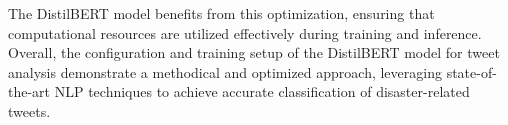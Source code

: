 The DistilBERT model benefits from this optimization, ensuring that computational resources are utilized effectively during training and inference.
Overall, the configuration and training setup of the DistilBERT model for tweet analysis demonstrate a methodical and optimized approach, leveraging state-of-the-art NLP techniques to achieve accurate classification of disaster-related tweets.



